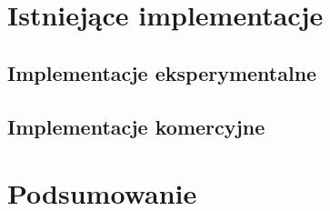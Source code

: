 \documentclass[10pt]{article}
\begin{document}
\section{Istniejące implementacje}

\subsection{Implementacje eksperymentalne}

\subsection{Implementacje komercyjne}


\section{Podsumowanie}

\nocite{*}



\end{document}
